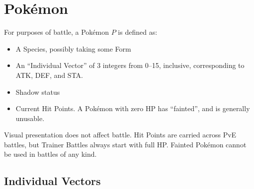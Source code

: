 \chapter{Pokémon}
For purposes of battle, a Pokémon $P$ is defined as:
\begin{itemize}
\item A Species, possibly taking some Form
\item An ``Individual Vector'' of 3 integers from 0--15, inclusive, corresponding to ATK, DEF, and STA.
\item Shadow status
\item Current Hit Points. A Pokémon with zero HP has ``fainted'', and is generally unusable.
\end{itemize}
Visual presentation does not affect battle.
Hit Points are carried across PvE battles, but Trainer Battles always start
 with full HP.
Fainted Pokémon cannot be used in battles of any kind.

\section{Individual Vectors}
\label{section:ivs}
